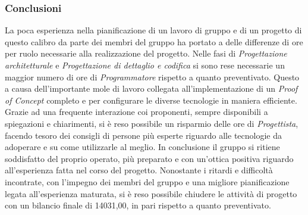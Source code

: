 \subsubsection{Conclusioni}
La poca esperienza nella pianificazione di un lavoro di gruppo e di un progetto di questo calibro da parte dei membri del gruppo ha portato a delle differenze di ore per ruolo necessarie alla realizzazione del progetto. Nelle fasi di \textit{Progettazione architetturale} e \textit{Progettazione di dettaglio e codifica} si sono rese necessarie un maggior numero di ore di \textit{Programmatore} rispetto a quanto preventivato. Questo a causa dell'importante mole di lavoro collegata all'implementazione di un \textit{Proof of Concept} completo e per configurare le diverse tecnologie in maniera efficiente. Grazie ad una frequente interazione coi proponenti, sempre disponibili a spiegazioni e chiarimenti, si è reso possibile un risparmio delle ore di \textit{Progettista}, facendo tesoro dei consigli di persone più esperte riguardo alle tecnologie da adoperare e su come utilizzarle al meglio. In conclusione il gruppo si ritiene soddisfatto del proprio operato, più preparato e con un'ottica positiva riguardo all'esperienza fatta nel corso del progetto. Nonostante i ritardi e difficoltà incontrate, con l'impegno dei membri del gruppo e una migliore pianificazione legata all'esperienza maturata, si è reso possibile chiudere le attività di progetto con un bilancio finale di 14031,00\EURdig, in pari rispetto a quanto preventivato.
